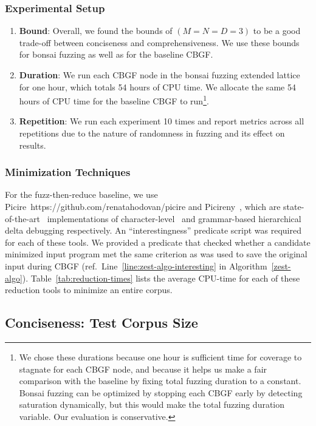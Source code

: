 \documentclass[conference]{IEEEtran}
\newcommand{\tech}{bonsai fuzzing} \newcommand{\Tech}{Bonsai fuzzing} \newcommand{\TECH}{Bonsai Fuzzing}
\begin{document}
\subsubsection*{Experimental Setup}
\begin{enumerate}
    \item \textbf{Bound}: Overall, we found the bounds of $(M = N = D = 3)$ to be a good trade-off between conciseness and comprehensiveness. We use these bounds for \tech{} as well as for the baseline CBGF.
    \item \textbf{Duration}: We run each CBGF node in the \tech{} extended lattice for one hour, which totals 54 hours of CPU time. We allocate the same 54 hours of CPU time for the baseline CBGF to run\footnote{We chose these durations because one hour is sufficient time for coverage to stagnate for each CBGF node, and because it helps us make a fair comparison with the baseline by fixing total fuzzing duration to a constant. \Tech{} can be optimized by stopping each CBGF early by detecting saturation dynamically, but this would make the total fuzzing duration variable. Our evaluation is conservative.}. 
    \item \textbf{Repetition}: We run each experiment 10 times and report metrics across all repetitions due to the nature of randomness in fuzzing and its effect on results.
\end{enumerate}

\subsubsection*{Minimization Techniques} For the fuzz-then-reduce baseline, we use Picire~https://github.com/renatahodovan/picire and Picireny~\cite{Picireny}, which are state-of-the-art~\cite{Hodovan16-a, Hodovan16-b, Hodovan17-c, Hodovan17-d} implementations of character-level~\cite{Zeller02} and grammar-based hierarchical~\cite{Misherghi06} delta debugging respectively. An ``interestingness'' predicate script was required for each of these tools. We provided a predicate that checked whether a candidate minimized input program met the same criterion as was used to save the original input during CBGF (ref.~Line~\ref{line:zest-algo-interesting} in Algorithm~\ref{zest-algo}).
Table~\ref{tab:reduction-times} lists the average CPU-time for each of these reduction tools to minimize an entire corpus.



\subsection{Conciseness: Test Corpus Size}
\end{document}
